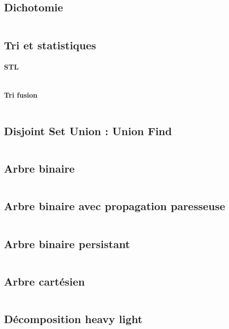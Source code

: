 \documentclass[10pt,twocolumn]{article}
\begin{document}
\subsection{Dichotomie}
\inputminted[breaklines,tabsize=4]{cpp}{code/binary_search.cpp}

\subsection{Tri et statistiques}
\paragraph{STL}
\inputminted[breaklines,tabsize=4]{cpp}{code/sort.cpp}
\paragraph{Tri fusion}
\inputminted[breaklines,tabsize=4]{cpp}{code/mergesort.cpp}

\subsection{Disjoint Set Union : Union Find}
\inputminted[breaklines,tabsize=4]{cpp}{code/dsu.cpp}

\subsection{Arbre binaire}
\inputminted[breaklines,tabsize=4]{cpp}{code/bintree.cpp}

\subsection{Arbre binaire avec propagation paresseuse}
\inputminted[breaklines,tabsize=4]{cpp}{code/lazytree.cpp}

\subsection{Arbre binaire persistant}
\inputminted[breaklines,tabsize=4]{cpp}{code/persistenttree.cpp}

\subsection{Arbre cart\'esien}
\inputminted[breaklines,tabsize=4]{cpp}{code/treap.cpp}

\subsection{Décomposition heavy light}
\inputminted[breaklines,tabsize=4]{cpp}{code/heavylight.cpp}
\end{document}
